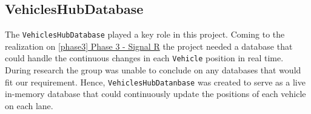 \subsection{VehiclesHubDatabase}
The \verb|VehiclesHubDatabase| played a key role in this project. Coming to the realization on \hyperref[phase3]{\ref{phase3} Phase 3 - Signal R} the project needed a database that could handle the continuous changes in each \verb|Vehicle| position in real time. During research the group was unable to conclude on any databases that would fit our requirement. Hence, \verb|VehiclesHubDatanbase| was created to serve as a live in-memory database that could continuously update the positions of each vehicle on each lane.

